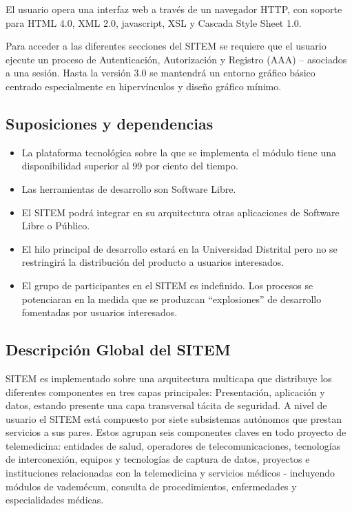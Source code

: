 El usuario opera una interfaz web a través de un navegador HTTP, con soporte para HTML 4.0, XML 2.0, javascript, XSL y Cascada Style Sheet 1.0. 

Para acceder a las diferentes secciones del SITEM se requiere que el usuario ejecute un proceso de Autenticación, Autorización y Registro (AAA) – asociados a una sesión. Hasta la versión 3.0 se mantendrá un entorno gráfico básico centrado especialmente en hipervínculos y diseño gráfico mínimo.

\subsection{Suposiciones y dependencias}
\begin{itemize}
\item La plataforma tecnológica sobre la que se implementa el módulo tiene una disponibilidad superior al 99 por ciento del tiempo.
\item Las herramientas de desarrollo son Software Libre.
\item El SITEM podrá integrar en su arquitectura otras aplicaciones de Software Libre o Público.
\item El hilo principal de desarrollo estará en la Universidad Distrital pero no se restringirá la distribución del producto a usuarios interesados.
\item El grupo de participantes en el SITEM es indefinido. Los procesos se potenciaran en la medida que se produzcan “explosiones” de desarrollo fomentadas por usuarios interesados.
\end{itemize}

\subsection{Descripción Global del SITEM}

SITEM es implementado sobre una arquitectura multicapa que distribuye los diferentes componentes en tres capas principales: Presentación, aplicación y datos, estando presente una capa transversal tácita de seguridad. A nivel de usuario el SITEM está compuesto por siete subsistemas autónomos que prestan servicios a sus pares. Estos agrupan seis componentes claves en todo proyecto de telemedicina: entidades de salud, operadores de telecomunicaciones, tecnologías de interconexión, equipos y tecnologías de captura de datos, proyectos e instituciones relacionadas con la telemedicina y servicios médicos - incluyendo módulos de vademécum, consulta de procedimientos, enfermedades y especialidades médicas.

